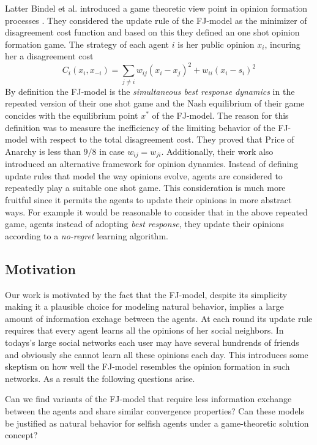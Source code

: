 Latter Bindel et al. introduced a game theoretic
view point in opinion formation processes \cite{BKO11}.
They considered the update rule of the FJ-model
as the minimizer of disagreement cost function
and based on this they defined an one shot 
opinion formation game. The strategy of each agent $i$ is 
her public opinion $x_i$, incuring her a 
disagreement cost \[C_i(x_i,x_{-i})=\sum_{j \neq i}w_{ij} 
(x_i-x_j)^2 + w_{ii}(x_i-s_i)^2\]
By definition the FJ-model is the 
\emph{simultaneous best response dynamics} in the repeated
version of their one shot game and the Nash equilibrium
of their game concides with the equilibrium point 
$x^*$ of the FJ-model. The reason for this definition
was to measure the inefficiency of the limiting behavior 
of the FJ-model with respect to the total disagreement cost.
They proved that Price of Anarchy is less than $9/8$
in case $w_{ij}=w_{ji}$. Additionally, their work also introduced
an alternative framework for opinion dynamics.
Instead of defining update rules that model the
way opinions evolve, agents are considered to repeatedly
play a suitable one shot game. This consideration is 
much more fruitful since it permits the agents to
update their opinions in more abstract ways.
For example it would be reasonable to consider
that in the above repeated game, agents instead of
adopting \emph{best response}, they update their opinions according 
to a \emph{no-regret} learning algorithm. 

\subsection{Motivation}
Our work is motivated by the fact that the FJ-model, 
despite its simplicity making it a plausible choice 
for modeling natural behavior, implies a large amount of
information exchage between the agents. At each round
its update rule requires that every agent learns all the 
opinions of her social neighbors.
In todays's large social networks each user
may have several hundrends of friends and obviously
she cannot learn all these opinions each day.
This introduces some skeptism on how well the 
FJ-model resembles the opinion formation in such
networks. As a result the following questions arise.

\begin{question}
Can we find variants of the FJ-model that 
require less information exchange between the agents
and share similar convergence properties?
Can these models be justified as natural behavior for selfish
agents under a game-theoretic solution concept?
\end{question}


